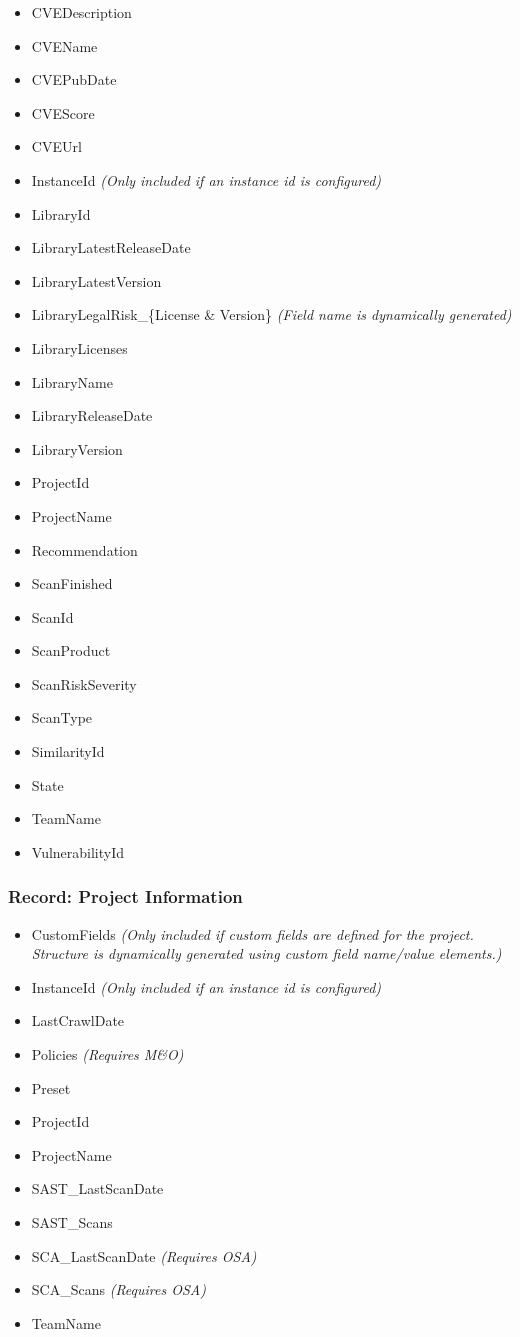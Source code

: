 \begin{itemize}
    \item CVEDescription
    \item CVEName
    \item CVEPubDate
    \item CVEScore
    \item CVEUrl
    \item InstanceId \textit{(Only included if an instance id is configured)}
    \item LibraryId
    \item LibraryLatestReleaseDate
    \item LibraryLatestVersion
    \item LibraryLegalRisk\_\{License \& Version\} \textit{(Field name is dynamically generated)}
    \item LibraryLicenses
    \item LibraryName
    \item LibraryReleaseDate
    \item LibraryVersion
    \item ProjectId
    \item ProjectName
    \item Recommendation
    \item ScanFinished
    \item ScanId
    \item ScanProduct
    \item ScanRiskSeverity
    \item ScanType
    \item SimilarityId
    \item State
    \item TeamName
    \item VulnerabilityId    
\end{itemize}


\subsubsection{Record: Project Information}

\begin{itemize}
    \item CustomFields \textit{(Only included if custom fields are defined for the project.  Structure is dynamically generated using custom field name/value elements.)}
    \item InstanceId \textit{(Only included if an instance id is configured)}
    \item LastCrawlDate
    \item Policies \textit{(Requires M\&O)}
    \item Preset
    \item ProjectId
    \item ProjectName
    \item SAST\_LastScanDate
    \item SAST\_Scans
    \item SCA\_LastScanDate \textit{(Requires OSA)}
    \item SCA\_Scans \textit{(Requires OSA)}
    \item TeamName
\end{itemize}



